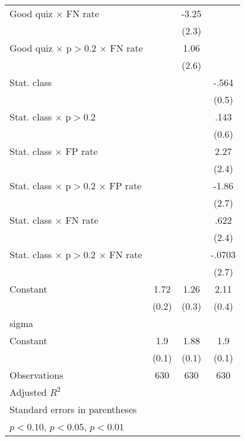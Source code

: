 {\begin{tabular}{l*{3}{c}}
Good quiz $\times$ FN rate&                  &    -3.25         &                  \\
                &                  &    (2.3)         &                  \\
Good quiz $\times$ p$>$0.2 $\times$ FN rate&                  &     1.06         &                  \\
                &                  &    (2.6)         &                  \\
Stat. class     &                  &                  &    -.564         \\
                &                  &                  &    (0.5)         \\
Stat. class $\times$ p$>$0.2&                  &                  &     .143         \\
                &                  &                  &    (0.6)         \\
Stat. class $\times$ FP rate&                  &                  &     2.27         \\
                &                  &                  &    (2.4)         \\
Stat. class $\times$ p$>$0.2 $\times$ FP rate&                  &                  &    -1.86         \\
                &                  &                  &    (2.7)         \\
Stat. class $\times$ FN rate&                  &                  &     .622         \\
                &                  &                  &    (2.4)         \\
Stat. class $\times$ p$>$0.2 $\times$ FN rate&                  &                  &   -.0703         \\
                &                  &                  &    (2.7)         \\
Constant        &     1.72\sym{***}&     1.26\sym{***}&     2.11\sym{***}\\
                &    (0.2)         &    (0.3)         &    (0.4)         \\
\hline
sigma           &                  &                  &                  \\
Constant        &      1.9\sym{***}&     1.88\sym{***}&      1.9\sym{***}\\
                &    (0.1)         &    (0.1)         &    (0.1)         \\
\hline
Observations    &      630         &      630         &      630         \\
Adjusted \(R^{2}\)&                  &                  &                  \\
\hline\hline
\multicolumn{4}{l}{\footnotesize Standard errors in parentheses}\\
\multicolumn{4}{l}{\footnotesize \sym{*} \(p<0.10\), \sym{**} \(p<0.05\), \sym{***} \(p<0.01\)}\\
\end{tabular}
}
